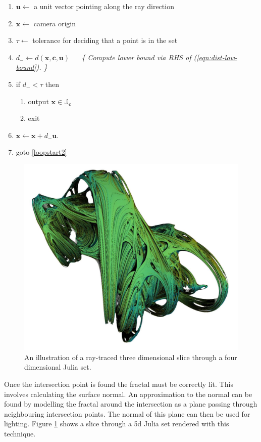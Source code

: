 \documentclass{elsart}
\theoremstyle{definition}
\begin{document}
\begin{enumerate}
\item $\mathbf{u} \leftarrow$ a unit vector pointing along the ray direction
\item $\mathbf{x} \leftarrow $ camera origin
\item $\tau \leftarrow$ tolerance for deciding that a point is in the set
\item $d_- \leftarrow d(\mathbf{x}, \mathbf{c}, \mathbf{u})$ \label{loopstart2} $\quad$ \emph{\{ Compute lower bound via RHS of (\ref{eqn:dist-low-bound}). \}}
\item if $d_- < \tau$ then
  \begin{enumerate}
  \item output $\mathbf{x} \in \mathbb{J}_{\mathbf{c}}$
  \item exit
  \end{enumerate}
\item $\mathbf{x} \leftarrow \mathbf{x} + d_-\mathbf{u}$.
\item goto \ref{loopstart2}
\end{enumerate}

\begin{figure}
\centering
\includegraphics[width=\textwidth]{figures/generated-fractal-sm}
\caption{\label{fig:5djulia}An illustration of a ray-traced
three dimensional slice through a four dimensional Julia set.
}
\end{figure}

Once the intersection point is found the fractal must be correctly lit.
This involves calculating the surface normal. An approximation to the normal
can be found by modelling the fractal around the intersection as a plane
passing through neighbouring intersection points. The normal of this plane can
then be used for lighting. Figure \ref{fig:5djulia} shows a slice through a 5d
Julia set rendered with this technique.
\end{document}
